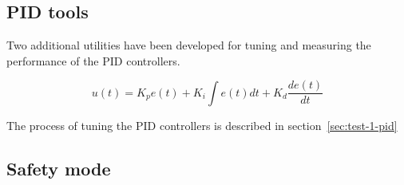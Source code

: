 \subsection{PID tools}

Two additional utilities have been developed for tuning and measuring the performance of the PID controllers.

\begin{equation}
    u(t)= K_p e(t) + K_i \int{e(t)dt} + K_d \frac{de(t)}{dt}
    \label{eq:pid}
\end{equation}

The process of tuning the PID controllers is described in section~\ref{sec:test-1-pid}


\subsection{Safety mode}
\label{subsec:safety}

\todo{}
\todo{}

